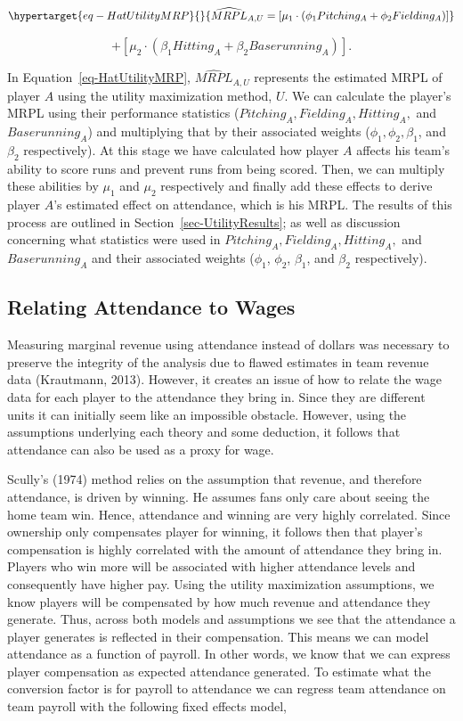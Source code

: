 \documentclass[
  12pt,
  letterpaper,
  DIV=11,
  numbers=noendperiod]{scrartcl}
\begin{document}
\begin{equation}\protect\hypertarget{eq-HatUtilityMRP}{}{
\widehat{MRPL}_{A,U}=[\mu_1\cdot(\phi_1Pitching_A+\phi_2Fielding_A)]
}\label{eq-HatUtilityMRP}\end{equation}

\[
+[\mu_2\cdot(\beta_1Hitting_A+\beta_2Baserunning_A)].
\]

In Equation~\ref{eq-HatUtilityMRP}, \(\widehat{MRPL}_{A,U}\) represents
the estimated MRPL of player \(A\) using the utility maximization
method, \(U\). We can calculate the player's MRPL using their
performance statistics (\(Pitching_A, Fielding_A, Hitting_A,\) and
\(Baserunning_A\)) and multiplying that by their associated weights
(\(\phi_1, \phi_2, \beta_1\), and \(\beta_2\) respectively). At this
stage we have calculated how player \(A\) affects his team's ability to
score runs and prevent runs from being scored. Then, we can multiply
these abilities by \(\mu_1\) and \(\mu_2\) respectively and finally add
these effects to derive player \(A\)'s estimated effect on attendance,
which is his MRPL. The results of this process are outlined in
Section~\ref{sec-UtilityResults}; as well as discussion concerning what
statistics were used in \(Pitching_A, Fielding_A, Hitting_A,\) and
\(Baserunning_A\) and their associated weights (\(\phi_1\), \(\phi_2\),
\(\beta_1\), and \(\beta_2\) respectively).

\hypertarget{sec-AttToWageMethod}{%
\subsection{Relating Attendance to Wages}\label{sec-AttToWageMethod}}

Measuring marginal revenue using attendance instead of dollars was
necessary to preserve the integrity of the analysis due to flawed
estimates in team revenue data (Krautmann, 2013). However, it creates an
issue of how to relate the wage data for each player to the attendance
they bring in. Since they are different units it can initially seem like
an impossible obstacle. However, using the assumptions underlying each
theory and some deduction, it follows that attendance can also be used
as a proxy for wage.

Scully's (1974) method relies on the assumption that revenue, and
therefore attendance, is driven by winning. He assumes fans only care
about seeing the home team win. Hence, attendance and winning are very
highly correlated. Since ownership only compensates player for winning,
it follows then that player's compensation is highly correlated with the
amount of attendance they bring in. Players who win more will be
associated with higher attendance levels and consequently have higher
pay. Using the utility maximization assumptions, we know players will be
compensated by how much revenue and attendance they generate. Thus,
across both models and assumptions we see that the attendance a player
generates is reflected in their compensation. This means we can model
attendance as a function of payroll. In other words, we know that we can
express player compensation as expected attendance generated. To
estimate what the conversion factor is for payroll to attendance we can
regress team attendance on team payroll with the following fixed effects
model,
\end{document}
